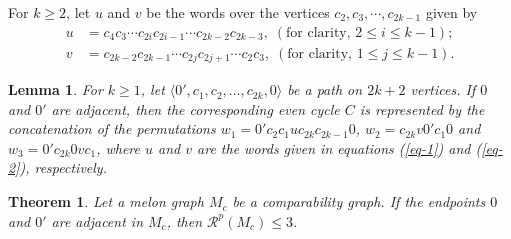 \documentclass[10pt,a4paper]{amsart}
\newtheorem{theorem}{Theorem}
\newtheorem{lemma}{Lemma}
\begin{document}
For $k \ge 2$, let $u$ and $v$ be the words over the vertices $c_2, c_3, \cdots, c_{2k-1}$ given by 
\begin{eqnarray}
	\label{eq-1} u &= c_{4} c_{3} \cdots c_{2i} c_{2i-1} \cdots c_{2k-2} c_{2k-3},\; (\text{for clarity, } 2 \le i \le k-1);\\
	\label{eq-2} v &= c_{2k-2} c_{2k-1} \cdots c_{2j} c_{2j+1} \cdots c_2 c_3,\; (\text{for clarity, } 1 \le j \le k-1).
\end{eqnarray} 

\begin{lemma}\label{even_cycle_word}
	For $k \ge 1$, let $\langle 0', c_1, c_2, \ldots, c_{2k}, 0 \rangle$ be a path on $2k+2$ vertices. If $0$ and $0'$ are adjacent, then the corresponding even cycle $C$ is  represented by the concatenation of the permutations $w_1 = 0' c_2 c_1 uc_{2k} c_{2k-1} 0$, $w_2 = c_{2k} v 0' c_1 0$ and $w_3 = 0' c_{2k} 0 v c_1$, where $u$ and $v$ are the words given in equations (\ref{eq-1}) and (\ref{eq-2}), respectively.
\end{lemma}

\begin{theorem}\label{00'adj_fc}
	Let a melon graph $M_c$ be a comparability graph. If the endpoints $0$ and $0'$ are adjacent in $M_c$, then $\mathcal{R}^p(M_c) \le 3$.
\end{theorem}
\end{document}
